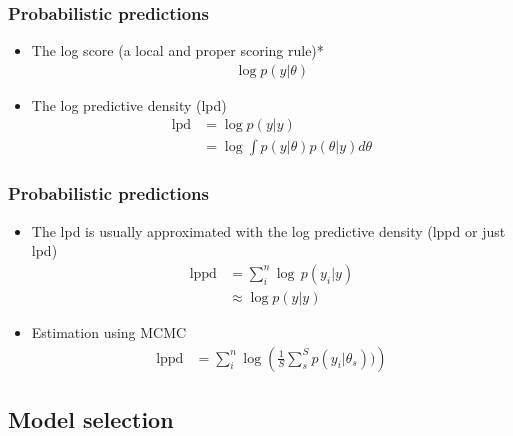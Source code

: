 \documentclass[10pt]{beamer}
\begin{document}
\begin{frame}
\frametitle{Probabilistic predictions}

    \begin{itemize}
      \item The log score (a local and proper scoring rule)* %
      \begin{align*}
         \log p(y|\theta)
      \end{align*}
      \pause
      \item The log predictive density (lpd)
      \begin{align*}
        \text{lpd} & = \log p(y|y)\\
        & = \log \int p(y|\theta) p(\theta|y) d\theta
      \end{align*}
  \end{itemize}

\end{frame}

\begin{frame}
\frametitle{Probabilistic predictions}

    \begin{itemize}
      \item The lpd is usually approximated with the log  predictive density (lppd or just lpd)
      \begin{align*}
        \text{lppd} & = \sum_i^n \log \, p(y_i|y)\\
        & \approx \log p(y|y)
      \end{align*}
      \pause
      \item Estimation using MCMC
      \begin{align*}
        \text{lppd} & = \sum_i^n \log \left(\frac{1}{S} \sum^S_s p(y_i|\theta_{s})) \right)
      \end{align*}
  \end{itemize}

\end{frame}


\subsection{Model selection}
\frame{\subsectionpage}
\end{document}
